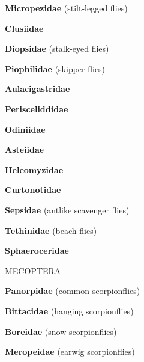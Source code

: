 \documentclass[letterpaper,10pt]{article}
\begin{document}
{\makebox[0.6cm]{}  \textbf{Micropezidae} (stilt-legged flies) \par
\makebox[0.6cm]{}  \textbf{Clusiidae} \par
\makebox[0.6cm]{}  \textbf{Diopsidae} (stalk-eyed flies) \par
\makebox[0.6cm]{}  \textbf{Piophilidae} (skipper flies) \par
\makebox[0.6cm]{}  \textbf{Aulacigastridae} \par
\makebox[0.6cm]{}  \textbf{Perisceliddidae} \par
\makebox[0.6cm]{}  \textbf{Odiniidae} \par
\makebox[0.6cm]{}  \textbf{Asteiidae} \par
\makebox[0.6cm]{}  \textbf{Heleomyzidae} \par
\makebox[0.6cm]{}  \textbf{Curtonotidae} \par
\makebox[0.6cm]{}  \textbf{Sepsidae} (antlike scavenger flies) \par
\makebox[0.6cm]{}  \textbf{Tethinidae} (beach flies) \par
\makebox[0.6cm]{}  \textbf{Sphaeroceridae} \par
%
%
%
\makebox[0.0cm]{}  MECOPTERA \par
\makebox[0.6cm]{}  \textbf{Panorpidae} (common scorpionflies) \par
\makebox[0.6cm]{}  \textbf{Bittacidae} (hanging scorpionflies) \par
\makebox[0.6cm]{}  \textbf{Boreidae} (snow scorpionflies) \par
\makebox[0.6cm]{}  \textbf{Meropeidae} (earwig scorpionflies) \par
}
\end{document}
